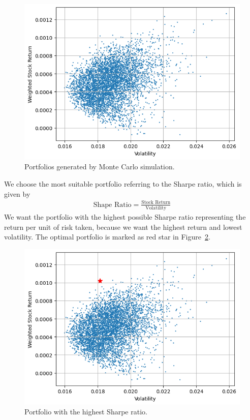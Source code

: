 \documentclass[a4paper, 11pt]{my-elegantpaper}
\begin{document}
\begin{figure}[H]
    \centering
    \includegraphics[scale=0.5]{figures/monte-carlo.png}
    \caption{Portfolios generated by Monte Carlo simulation.}
    \label{fig:6}
\end{figure}

We choose the most suitable portfolio referring to the Sharpe ratio, which is given by 
\begin{align*}
    \text{Shape Ratio} = \frac{\text{Stock Return}}{\text{Volatility}}
\end{align*}
We want the portfolio with the highest possible Sharpe ratio representing the return per unit of risk taken, because we want the highest return and lowest volatility. The optimal portfolio is marked as red star in Figure~\ref{fig:7}. 

\begin{figure}[H]
    \centering
    \includegraphics[scale=0.5]{figures/portfolio.png}
    \caption{Portfolio with the highest Sharpe ratio.}
    \label{fig:7}
\end{figure}
\end{document}
